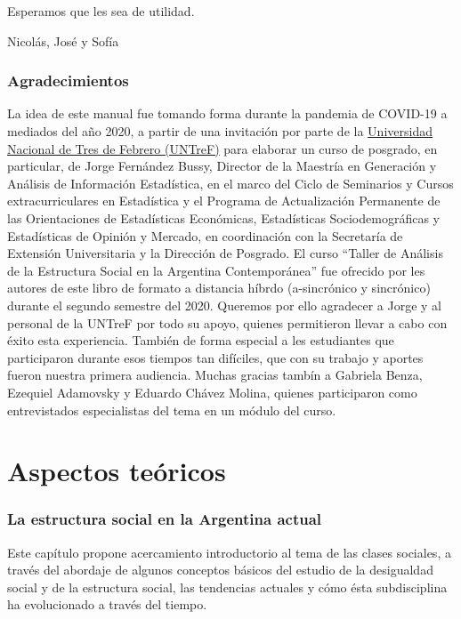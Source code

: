 \documentclass[
]{article}
\begin{document}
Esperamos que les sea de utilidad.

Nicolás, José y Sofía

\hypertarget{agradecimientos}{%
\section*{Agradecimientos}\label{agradecimientos}}

La idea de este manual fue tomando forma durante la pandemia de COVID-19 a mediados del año 2020, a partir de una invitación por parte de la \href{https://untref.edu.ar}{Universidad Nacional de Tres de Febrero (UNTreF)} para elaborar un curso de posgrado, en particular, de Jorge Fernández Bussy, Director de la Maestría en Generación y Análisis de Información Estadística, en el marco del Ciclo de Seminarios y Cursos extracurriculares en Estadística y el Programa de Actualización Permanente de las Orientaciones de Estadísticas Económicas, Estadísticas Sociodemográficas y Estadísticas de Opinión y Mercado, en coordinación con la Secretaría de Extensión Universitaria y la Dirección de Posgrado. El curso ``Taller de Análisis de la Estructura Social en la Argentina Contemporánea'' fue ofrecido por les autores de este libro de formato a distancia híbrdo (a-sincrónico y sincrónico) durante el segundo semestre del 2020. Queremos por ello agradecer a Jorge y al personal de la UNTreF por todo su apoyo, quienes permitieron llevar a cabo con éxito esta experiencia. También de forma especial a les estudiantes que participaron durante esos tiempos tan difíciles, que con su trabajo y aportes fueron nuestra primera audiencia. Muchas gracias tambín a Gabriela Benza, Ezequiel Adamovsky y Eduardo Chávez Molina, quienes participaron como entrevistados especialistas del tema en un módulo del curso.

\hypertarget{part-aspectos-teuxf3ricos}{%
\part{Aspectos teóricos}\label{part-aspectos-teuxf3ricos}}

\hypertarget{estructura1}{%
\section{La estructura social en la Argentina actual}\label{estructura1}}

Este capítulo propone acercamiento introductorio al tema de las clases sociales, a través del abordaje de algunos conceptos básicos del estudio de la desigualdad social y de la estructura social, las tendencias actuales y cómo ésta subdisciplina ha evolucionado a través del tiempo.
\end{document}
